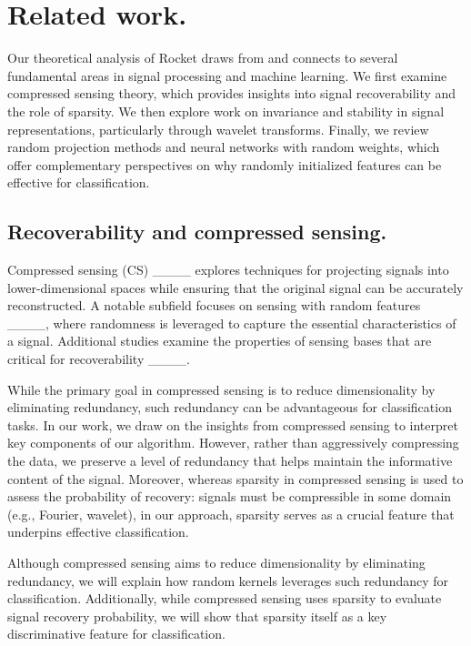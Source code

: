 \section{Related work.}
\label{related}

Our theoretical analysis of Rocket draws from and connects to several fundamental areas in signal processing and machine learning. We first examine compressed sensing theory, which provides insights into signal recoverability and the role of sparsity. We then explore work on invariance and stability in signal representations, particularly through wavelet transforms. Finally, we review random projection methods and neural networks with random weights, which offer complementary perspectives on why randomly initialized features can be effective for classification.


\subsection{Recoverability and compressed sensing.}

Compressed sensing (CS) ____ explores techniques for projecting signals into lower-dimensional spaces while ensuring that the original signal can be accurately reconstructed. A notable subfield focuses on sensing with random features ____, where randomness is leveraged to capture the essential characteristics of a signal. Additional studies examine the properties of sensing bases that are critical for recoverability ____.

While the primary goal in compressed sensing is to reduce dimensionality by eliminating redundancy, such redundancy can be advantageous for classification tasks. In our work, we draw on the insights from compressed sensing to interpret key components of our algorithm. However, rather than aggressively compressing the data, we preserve a level of redundancy that helps maintain the informative content of the signal. Moreover, whereas sparsity in compressed sensing is used to assess the probability of recovery: signals must be compressible in some domain (e.g., Fourier, wavelet), in our approach, sparsity serves as a crucial feature that underpins effective classification.

Although compressed sensing aims to reduce dimensionality by eliminating redundancy, we will explain how random kernels leverages such redundancy for classification. Additionally, while compressed sensing uses sparsity to evaluate signal recovery probability, we will show that sparsity itself as a key discriminative feature for classification.


